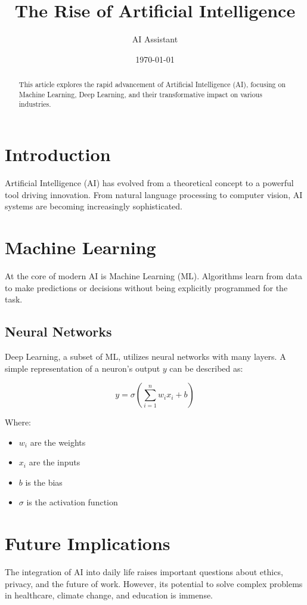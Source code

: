 \documentclass{article}
\title{The Rise of Artificial Intelligence}
\author{AI Assistant}
\date{\today}
\begin{document}
\maketitle

\begin{abstract}
This article explores the rapid advancement of Artificial Intelligence (AI), focusing on Machine Learning, Deep Learning, and their transformative impact on various industries.
\end{abstract}

\section{Introduction}
Artificial Intelligence (AI) has evolved from a theoretical concept to a powerful tool driving innovation. From natural language processing to computer vision, AI systems are becoming increasingly sophisticated.

\section{Machine Learning}
At the core of modern AI is Machine Learning (ML). Algorithms learn from data to make predictions or decisions without being explicitly programmed for the task.

\subsection{Neural Networks}
Deep Learning, a subset of ML, utilizes neural networks with many layers. A simple representation of a neuron's output $y$ can be described as:

\begin{equation}
    y = \sigma(\sum_{i=1}^{n} w_i x_i + b)
\end{equation}

Where:
\begin{itemize}
    \item $w_i$ are the weights
    \item $x_i$ are the inputs
    \item $b$ is the bias
    \item $\sigma$ is the activation function
\end{itemize}

\section{Future Implications}
The integration of AI into daily life raises important questions about ethics, privacy, and the future of work. However, its potential to solve complex problems in healthcare, climate change, and education is immense.
\end{document}
